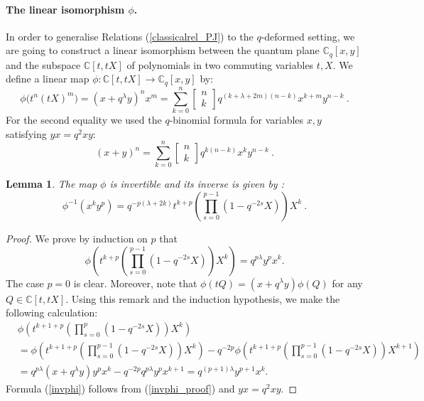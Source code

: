 \documentclass[a4paper,12pt]{article}
\numberwithin{equation}{section}
\newcommand{\C}{\mathbb{C}}
\newcommand{\qbinom}[2]{\begin{bmatrix}#1\\#2\end{bmatrix}}
\newtheorem{lemm}[theo]{Lemma}
\theoremstyle{rem}
\theoremstyle{definition}
\begin{document}
\paragraph{The linear isomorphism $\phi$.} In order to generalise Relations (\ref{classicalrel_PJ}) to the $q$-deformed setting, we are going to construct a linear isomorphism between the quantum plane $\C_q[x,y]$ and the subspace $\C[t,tX]$ of polynomials in two commuting variables $t,X$. We define a linear map $\phi: \C[t,tX] \to \C_q[x,y]$ by:
\begin{equation}\label{defphi}\phi\bigl(t^n(tX)^m\bigr)=(x+q^\lambda y)^n x^m=\sum_{k=0}^n\qbinom{n}{k}q^{(k+\lambda+2m)(n-k)}x^{k+m}y^{n-k}\ .
\end{equation}
For the second equality we used the $q$-binomial formula for variables $x,y$ satisfying $yx=q^2xy$:
\begin{equation}\label{eq:qBinomial}
(x+y)^n=\sum_{k=0}^n \qbinom{n}{k}q^{k(n-k)} x^ky^{n-k}\ .
\end{equation}
\begin{lemm}\label{lemma_actionphi}
The map $\phi$ is invertible and its inverse is given by :
\begin{equation}\label{invphi}
\phi^{-1}(x^ky^p)=q^{-p(\lambda+2k)}t^{k+p}\left(\prod_{s=0}^{p-1}(1-q^{-2s}X)\right) X^k\ .
\end{equation}
\end{lemm}
\begin{proof}
We prove by induction on $p$ that
\begin{equation}\label{invphi_proof}
\phi\left(t^{k+p}\left(\prod_{s=0}^{p-1}(1-q^{-2s}X)\right) X^k\right)=q^{p\lambda}y^px^k.
\end{equation}
The case $p=0$ is clear. Moreover, note that $\phi(tQ)=(x+q^{\lambda}y)\phi(Q)$ for any $Q\in\C[t,tX]$. Using this remark and the induction hypothesis, we make the following calculation:
\begin{align*}
&\phi\left(t^{k+1+p}\left(\prod_{s=0}^p (1-q^{-2s}X)\right) X^k\right) \\
&=\phi\left(t^{k+1+p}\left(\prod_{s=0}^{p-1} (1-q^{-2s}X)\right) X^k\right)-q^{-2p}\phi\left(t^{k+1+p}\left(\prod_{s=0}^{p-1} (1-q^{-2s}X)\right) X^{k+1}\right)\\
&=q^{p\lambda}(x+q^\lambda y)y^p x^k-q^{-2p}q^{p\lambda}y^px^{k+1} =q^{(p+1)\lambda}y^{p+1}x^k.
\end{align*}
Formula (\ref{invphi}) follows from (\ref{invphi_proof}) and $yx=q^2xy$.
\end{proof}
\end{document}
